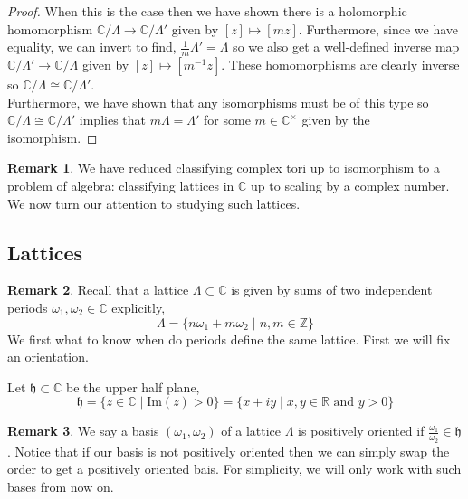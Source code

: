 \documentclass{article}
\newcommand{\Z}{\mathbb{Z}}
\newcommand{\R}{\mathbb{R}}
\newcommand{\C}{\mathbb{C}}
\renewcommand{\Im}[1]{\mathrm{Im}(#1)}
\theoremstyle{definition}
\newtheorem{remark}{Remark}[section]
\newenvironment{definition}[1][Definition:]{\begin{trivlist}
\item[\hskip \labelsep {\bfseries #1}]}{\end{trivlist}}
\newcommand{\h}{\mathfrak{h}}
\begin{document}
\begin{proof}
When this is the case then we have shown there is a holomorphic homomorphism $\C / \Lambda \to \C / \Lambda'$ given by $[z] \mapsto [m z]$. Furthermore, since we have equality, we can invert to find, $\frac{1}{m} \Lambda' = \Lambda$ so we also get a well-defined inverse map $\C / \Lambda' \to \C / \Lambda$ given by $[z] \mapsto [m^{-1} z]$. These homomorphisms are clearly inverse so $\C / \Lambda \cong \C / \Lambda'$.
\bigskip\\
Furthermore, we have shown that any isomorphisms must be of this type so $\C / \Lambda \cong \C / \Lambda'$ implies that $m \Lambda = \Lambda'$ for some $m \in \C^\times$ given by the isomorphism. 
\end{proof}

\begin{remark}
We have reduced classifying complex tori up to isomorphism to a problem of algebra: classifying lattices in $\C$ up to scaling by a complex number. We now turn our attention to studying such lattices.
\end{remark}



\subsection{Lattices}

\begin{remark}
Recall that a lattice $\Lambda \subset \C$ is given by sums of two independent periods $\omega_1, \omega_2 \in \C$ explicitly,
\[ \Lambda = \{ n \omega_1 + m \omega_2 \mid n,m \in \Z \} \]
We first what to know when do periods define the same lattice. First we will fix an orientation.
\end{remark}


\begin{definition}
Let $\h \subset \C$ be the upper half plane,
\[ \h = \{ z \in \C \mid \Im{z} > 0 \} = \{ x + iy \mid x, y \in \R \text{ and } y > 0 \} \]
\end{definition}

\begin{remark}
We say a basis $( \omega_1, \omega_2 )$ of a lattice $\Lambda$ is positively oriented if $\frac{\omega_1}{\omega_2} \in \h$. Notice that if our basis is not positively oriented then we can simply swap the order to get a positively oriented bais. For simplicity, we will only work with such bases from now on. 
\end{remark}
\end{document}
